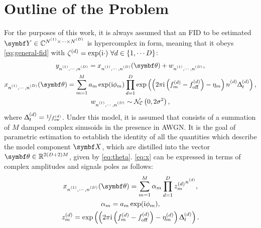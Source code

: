 \section{Outline of the Problem}
\label{sec:theory-outline}
For the purposes of this work, it is always assumed that an \ac{FID} to be
estimated
$\bY \in \mathbb{C}^{\None \times \cdots \times \ND}$
is hypercomplex in form, meaning that it obeys
\eqref{eq:general-fid} with $\zeta^{(d)} = \exp(\mathrm{i} \cdot)\ \forall d \in
\lbrace 1, \cdots D \rbrace$:
\begin{subequations}
    \begin{gather}
        \ynonenD = \xnonenD(\bth) + \wnonenD,\\
        \xnonenD(\bth) =
        \sumM \amexpphim
        \prodD \exp\left(\left(
            2 \pi \iu \left(f^{(d)}_m - \foffd\right)
            -\eta_m\right)
            \nd \Dtd\right),\\
            \label{eq:x}
        \wnonenD \sim \mathcal{N_C}\left(0, 2\sigma^2\right),
    \end{gather}
    \label{eq:hypercomplex-fid}
\end{subequations}%
where $\Updelta_t^{(d)} = \nicefrac{1}{f_{\mathrm{sw}}^{(d)}}$. Under this model, it is assumed that
 consists of a summation of $M$ damped complex sinusoids in the
presence in \ac{AWGN}.
It is the goal of parametric estimation to establish the
identity of all the quantities which describe the model component $\bX$, which
are distilled into the vector $\bth \in \mathbb{R}^{2(D + 2)M}$, given by
\eqref{eq:theta}.
\eqref{eq:x} can be expressed in terms of complex amplitudes and signals poles
as follows:
\begin{subequations}
    \begin{gather}
        \xnonenD(\bth) = \sumM \alpha_m \prodD {z^{(d)}_m}^{\nd},\\
        \alpha_m = \amexpphim,\\
        z_m^{(d)} = \exp\left(
            \left(2 \pi \iu \left(f_m^{(d)} - \foffd\right) - \eta^{(d)}_m\right) \Dtd
        \right).
    \end{gather}
    \label{eq:x-alpha-z}
\end{subequations}

